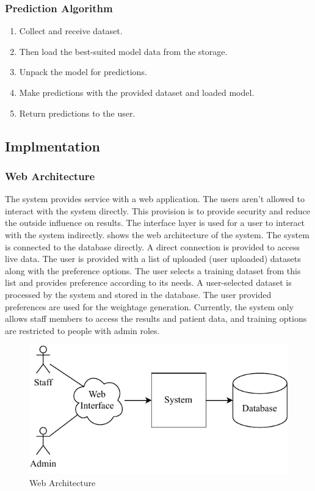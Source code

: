 \documentclass[a4paper,fleqn]{cas-dc}
\begin{document}
\vspace{-0.5em}
\subsubsection*{Prediction Algorithm}\label{subsubsec:prediction_algorithm}
\vspace{0.5em}
\begin{enumerate}
    \item Collect and receive dataset.
    \item Then load the best-suited model data from the storage.
    \item Unpack the model for predictions.
    \item Make predictions with the provided dataset and loaded model.
    \item Return predictions to the user.
\end{enumerate}

\subsection{Implmentation}\label{subsec:implmentation}

\subsubsection{Web Architecture}\label{subsubsec:web_architecture}

The system provides service with a web application. The users aren't allowed to interact with the system directly. This provision is to provide security and reduce the outside influence on results. The interface layer is used for a user to interact with the system indirectly.  shows the web architecture of the system. The system is connected to the database directly. A direct connection is provided to access live data. The user is provided with a list of uploaded (user uploaded) datasets along with the preference options. The user selects a training dataset from this list and provides preference according to its needs. A user-selected dataset is processed by the system and stored in the database. The user provided preferences are used for the weightage generation. Currently, the system only allows staff members to access the results and patient data, and training options are restricted to people with admin roles.

\begin{figure}[ht]
    \centering
    \includegraphics[width=0.9\columnwidth]{web_architecture.pdf}
    \caption{Web Architecture}
    \label{fig:web_architecture}
\end{figure}
\end{document}
